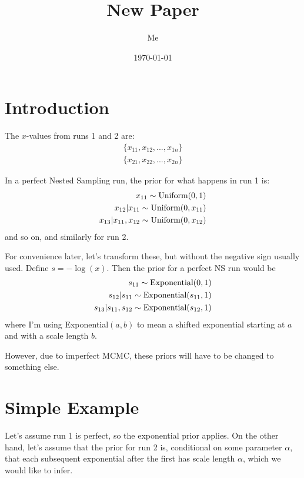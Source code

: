 \documentclass[a4paper, 11pt]{article}
\title{New Paper}
\author{Me}
\date{\today}
\begin{document}
\maketitle


\section{Introduction}
The $x$-values from runs 1 and 2 are:
\begin{eqnarray}
\{x_{11}, x_{12}, ..., x_{1n}\}\\
\{x_{21}, x_{22}, ..., x_{2n}\}
\end{eqnarray}

In a perfect Nested Sampling run, the prior for what happens in run 1 is:
\begin{eqnarray}
x_{11} \sim \textnormal{Uniform}(0, 1)\\
x_{12} | x_{11} \sim \textnormal{Uniform}(0, x_{11})\\
x_{13} | x_{11}, x_{12} \sim \textnormal{Uniform}(0, x_{12})
\end{eqnarray}
and so on, and similarly for run 2.

For convenience later, let's transform these, but without the negative sign
usually used. Define $s=-\log(x)$. Then the prior for a perfect NS run would be
\begin{eqnarray}
s_{11} \sim \textnormal{Exponential}(0, 1)\\
s_{12} | s_{11} \sim \textnormal{Exponential}(s_{11}, 1)\\
s_{13} | s_{11}, s_{12} \sim \textnormal{Exponential}(s_{12}, 1)
\end{eqnarray}
where I'm using Exponential$(a, b)$ to mean a shifted exponential starting
at $a$ and with a scale length $b$.

However, due to imperfect MCMC, these priors will have to be changed to
something else.

\section{Simple Example}
Let's assume run 1 is perfect, so the exponential prior applies. On the other
hand, let's assume that the prior for run 2 is, conditional on some parameter
$\alpha$, that each subsequent exponential after the first has scale
length $\alpha$, which we would like to infer.
\end{document}
